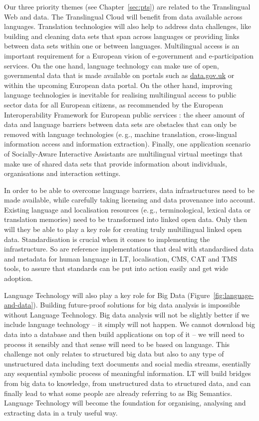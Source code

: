 \documentclass[10pt, plain]{../../metanetpaper}
\begin{document}
\begin{multicols}{2}
Our three priority themes (see Chapter~\ref{sec:pts}) are related to the Translingual Web and data. The Translingual Cloud will benefit from data available across languages. Translation technologies will also help to address data challenges, like building and cleaning data sets that span across languages or providing links between data sets within one or between languages. Multilingual access is an important requirement for a European vision of e-government and e-participation services. On the one hand, language technology can make use of open, governmental data that is made available on portals such as \url{data.gov.uk} or within the upcoming European data portal. On the other hand, improving language technologies is inevitable for realising multilingual access to public sector data for all European citizens, as recommended by the European Interoperability Framework for European public services \cite{EIF2010}: the sheer amount of data and language barriers between data sets are obstacles that can only be removed with language technologies (e.\,g., machine translation, cross-lingual information access and information extraction). Finally, one application scenario of Socially-Aware Interactive Assistants are multilingual virtual meetings that make use of shared data sets that provide information about individuals, organisations and interaction settings. 
 
In order to be able to overcome language barriers, data infrastructures need to be made available, while carefully taking licensing and data provenance into account. Existing language and localisation resources (e.\,g., terminological, lexical data or translation memories) need to be transformed into linked open data. Only then will they be able to play a key role for creating truly multilingual linked open data.  Standardisation is crucial when it comes to implementing the infrastructure. So are reference implementations that deal with standardised data and metadata for human language in LT, localisation, CMS, CAT and TMS tools, to assure that standards can be put into action easily and get wide adoption.

Language Technology will also play a key role for Big Data (Figure~\ref{fig:language-and-data}). Building future-proof solutions for big data analysis is impossible without Language Technology. Big data analysis will not be slightly better if we include language technology -- it simply will not happen. We cannot download big data into a database and then build applications on top of it -- we will need to process it sensibly and that sense will need to be based on language. This challenge not only relates to structured big data but also to any type of unstructured data including text documents and social media streams, esentially any sequential symbolic process of meaningful information. LT will build bridges from big data to knowledge, from unstructured data to structured data, and can finally lead to what some people are already referring to as Big Semantics. Language Technology will become the foundation for organising, analysing and extracting data in a truly useful way.


\end{multicols}
\end{document}
